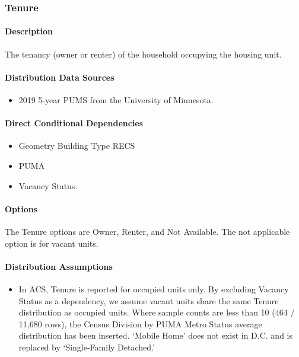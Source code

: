 \subsubsection{Tenure}\label{tenure}
\paragraph{Description}
The tenancy (owner or renter) of the household occupying the housing
unit.

\paragraph{Distribution Data Sources}
\begin{itemize}
\item
  2019 5-year PUMS from the University of Minnesota.
\end{itemize}

\paragraph{Direct Conditional Dependencies}
\begin{itemize}
    \item Geometry Building Type RECS
    \item PUMA
    \item Vacancy Status.
\end{itemize}

\paragraph{Options}
The Tenure options are Owner, Renter, and Not Available. The not applicable option is for vacant units.

\paragraph{Distribution Assumptions}
\begin{itemize}
\item
  In ACS, Tenure is reported for occupied units only. By excluding
  Vacancy Status as a dependency, we assume vacant units share the same
  Tenure distribution as occupied units. Where sample counts are less
  than 10 (464 / 11,680 rows), the Census Division by PUMA Metro Status
  average distribution has been inserted. `Mobile
  Home' does not exist in D.C. and is replaced by
  `Single-Family Detached.'
\end{itemize}

